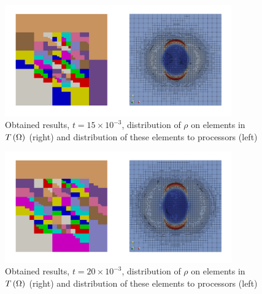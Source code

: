 \begin{figure}[H]
	\begin{center}
		\includegraphics[width=0.87\textwidth]{img/mhd-blast/old/mya4.jpg}
	\caption{Obtained results, $t = 15\times 10^{-3}$, distribution of $\rho$ on elements in $T\left(\Omega\right)$ (right) and distribution of these elements to processors (left)}
	\label{figure:blastOldMyAdapt4}
	\end{center}
\end{figure}
\vspace{-8mm}

\begin{figure}[H]
	\begin{center}
		\includegraphics[width=0.87\textwidth]{img/mhd-blast/old/mya5.jpg}
	\caption{Obtained results, $t = 20\times 10^{-3}$, distribution of $\rho$ on elements in $T\left(\Omega\right)$ (right) and distribution of these elements to processors (left)}
	\label{figure:blastOldMyAdapt5}
	\end{center}
\end{figure}
\vspace{-8mm}

